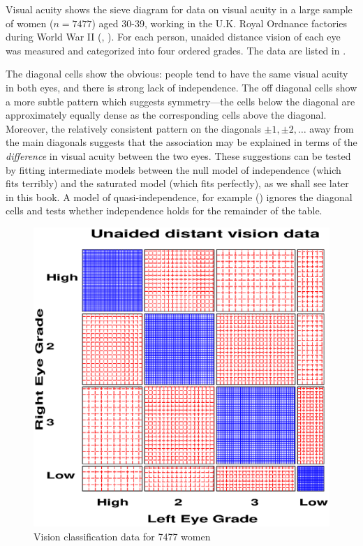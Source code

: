 \begin{Example}[vision1]{Visual acuity}
 shows the sieve diagram for data on visual acuity in a large
sample of women ($n=7477$) aged 30-39, working in the U.K.
Royal Ordnance factories during World War II
(\citet[Table 33.5]{KendallStuart:61},
\citet[p. 284]{Bishop-etal:75}).
For each person, unaided distance vision of each eye was measured
and categorized into four ordered grades.  The data are listed in
.

The diagonal cells show the obvious:
people tend to have the same visual acuity in both eyes, and there is
strong lack of independence.  The off diagonal cells show a more subtle
pattern which suggests symmetry---the cells below the diagonal
are approximately equally dense as the corresponding cells above the diagonal.
Moreover, the relatively consistent pattern on the diagonals
$\pm 1, \pm 2, \dots$ away from the main diagonals suggests
that the association may be explained in terms of the \emph{difference}
in visual acuity between the two eyes.
These suggestions can be tested by fitting  intermediate models
between the null model of independence (which fits terribly)
and the saturated model (which fits perfectly),
as we shall see later in this book.
A model of quasi-independence, for example ()
ignores the diagonal cells and tests whether independence holds
for the remainder of the table.

\begin{figure}[htb]
  \centering
  \includegraphics[scale=.5]{ch3/fig/sieve2}
  \caption{Vision classification data for 7477 women}\label{fig:sieve2}
\end{figure}
\end{Example}


